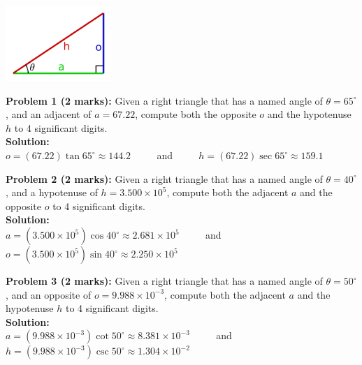 \documentclass{article}
\newcommand{\dr}[1]{\textcolor{dark_red}{#1}}
\begin{document}
\includegraphics[width = 0.3\textwidth]{right_triangle_v2}

\begin{framed}
\textbf{Problem 1 (2 marks):} Given a right triangle that has a named angle of \(\theta = 65^\circ\), and an adjacent of \(a = 67.22\), compute both the opposite \(o\) and the hypotenuse \(h\) to 4 significant digits. \\
\dr{\textbf{Solution:} \\
\(o = (67.22)\tan 65^\circ \approx 144.2\) ~~~~ and ~~~~ \(h = (67.22)\sec 65^\circ \approx 159.1\)
}
\end{framed}

\begin{framed}
\textbf{Problem 2 (2 marks):} Given a right triangle that has a named angle of \(\theta = 40^\circ\), and a hypotenuse of \(h = 3.500 \times 10^5\), compute both the adjacent \(a\) and the opposite \(o\) to 4 significant digits. \\
\dr{\textbf{Solution:} \\
\(a = (3.500 \times 10^5)\cos 40^\circ \approx 2.681 \times 10^5\) ~~~~ and ~~~~ \(o = (3.500 \times 10^5)\sin 40^\circ \approx 2.250 \times 10^5\)
}
\end{framed}

\begin{framed}
\textbf{Problem 3 (2 marks):} Given a right triangle that has a named angle of \(\theta = 50^\circ\), and an opposite of \(o = 9.988 \times 10^{-3}\), compute both the adjacent \(a\) and the hypotenuse \(h\) to 4 significant digits. \\
\dr{\textbf{Solution:} \\
\(a = (9.988 \times 10^{-3})\cot 50^\circ \approx 8.381 \times 10^{-3}\) ~~~~ and ~~~~ \(h = (9.988 \times 10^{-3})\csc 50^\circ \approx 1.304 \times 10^{-2}\)  
}  
\end{framed}
\end{document}
